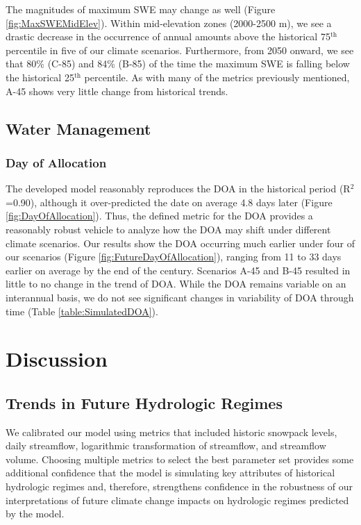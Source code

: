 \documentclass[11pt,letterpaper]{article}
\begin{document}
The magnitudes of maximum SWE may change as well (Figure \ref{fig:MaxSWEMidElev}). Within mid-elevation zones (2000-2500 m), we see a drastic decrease in the occurrence of annual amounts above the historical 75${}^\textrm{th}$ percentile in five of our climate scenarios. Furthermore, from 2050 onward, we see that 80\% (C-85) and 84\% (B-85) of the time the maximum SWE is falling below the historical 25${}^\textrm{th}$ percentile. As with many of the metrics previously mentioned, A-45 shows very little change from historical trends.

\subsection{Water Management}

\subsubsection{Day of Allocation}

The developed model reasonably reproduces the DOA in the historical period (R${}^2$=0.90), although it over-predicted the date on average 4.8 days later (Figure \ref{fig:DayOfAllocation}). Thus, the defined metric for the DOA provides a reasonably robust vehicle to analyze how the DOA may shift under different climate scenarios.
Our results show the DOA occurring much earlier under four of our scenarios (Figure \ref{fig:FutureDayOfAllocation}), ranging from 11 to 33 days earlier on average by the end of the century. Scenarios A-45 and B-45 resulted in little to no change in the trend of DOA. While the DOA remains variable on an interannual basis, we do not see significant changes in variability of DOA through time (Table \ref{table:SimulatedDOA}).

\section{Discussion}

\subsection{Trends in Future Hydrologic Regimes}

We calibrated our model using metrics that included historic snowpack levels, daily streamflow, logarithmic transformation of streamflow, and streamflow volume. Choosing multiple metrics to select the best parameter set provides some additional confidence that the model is simulating key attributes of historical hydrologic regimes and, therefore, strengthens confidence in the robustness of our interpretations of future climate change impacts on hydrologic regimes predicted by the model. 
\end{document}
